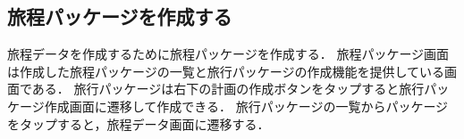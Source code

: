 


\subsection {旅程パッケージを作成する}
旅程データを作成するために旅程パッケージを作成する．
旅程パッケージ画面は作成した旅程パッケージの一覧と旅行パッケージの作成機能を提供している画面である．
旅行パッケージは右下の計画の作成ボタンをタップすると旅行パッケージ作成画面に遷移して作成できる．
旅行パッケージの一覧からパッケージをタップすると，旅程データ画面に遷移する．

